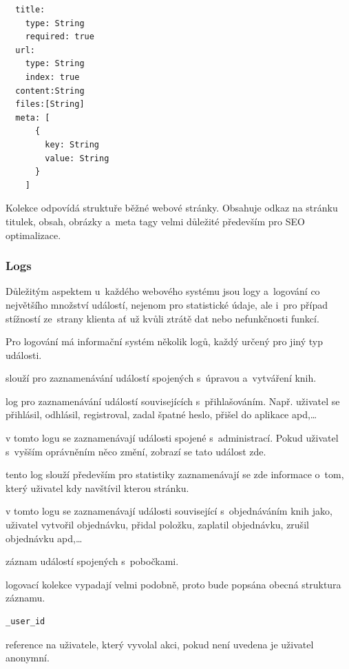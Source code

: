 \documentclass[a4paper,12pt,twoside,BCOR=10mm]{article}
\newenvironment{codeframe}{%
  \begin{Sbox} 
    \begin{minipage} 
      {\columnwidth-\leftmargin-\rightmargin-2\fboxsep-2\fboxrule-4pt} 
}{%

  \end{minipage} 
  \end{Sbox} 
  \begin{center} 
    \fcolorbox{black}{codeback}{\TheSbox} 
  \end{center} 
}
\begin{document}
\begin{codeframe}
  \begin{verbatim}
  title:
    type: String
    required: true
  url:
    type: String
    index: true
  content:String
  files:[String]
  meta: [
      {
        key: String
        value: String
      }
    ]
  \end{verbatim}
\end{codeframe}
Kolekce odpovídá struktuře běžné webové stránky. Obsahuje odkaz na stránku titulek, obsah, obrázky a~meta tagy velmi důležité především pro SEO optimalizace.

\subsubsection{Logs}
Důležitým aspektem u~každého webového systému jsou logy a~logování co největšího množství událostí, nejenom pro statistické údaje, ale i~pro případ stížností ze~strany klienta ať už kvůli ztrátě dat nebo nefunkčnosti funkcí.

Pro logování má informační systém několik logů, každý určený pro jiný typ události.

\begin{description}\label{database:log}
\item[Edit log] slouží pro zaznamenávání událostí spojených s~úpravou a~vytváření knih.
\item[Auth log] log pro zaznamenávání událostí souvisejících s~přihlašováním. Např. uživatel se přihlásil, odhlásil, registroval, zadal špatné heslo, přišel do aplikace apd,…
\item[Admin log] v tomto logu se zaznamenávají události spojené s~administrací. Pokud uživatel s~vyšším oprávněním něco změní, zobrazí se tato událost zde.
\item[Views log] tento log slouží především pro statistiky zaznamenávají se zde informace o~tom, který uživatel kdy navštívil kterou stránku.
\item[Orders log] v tomto logu se zaznamenávají události související s~objednáváním knih jako, uživatel vytvořil objednávku, přidal položku, zaplatil objednávku, zrušil objednávku apd,…
\item[Branches log] záznam událostí spojených s~pobočkami.
\end{description}
logovací kolekce vypadají velmi podobně, proto bude popsána obecná struktura záznamu.

\begin{codeframe}
  \begin{verbatim}
_user_id
  \end{verbatim}
\end{codeframe}
reference na uživatele, který vyvolal akci, pokud není uvedena je uživatel anonymní.
\end{document}
